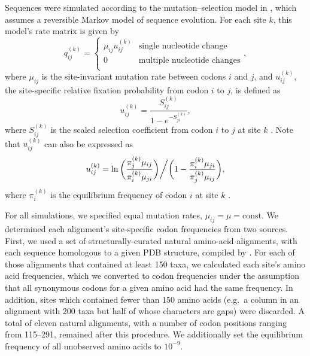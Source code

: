 \documentclass[11pt]{article}
\begin{document}
Sequences were simulated according to the mutation--selection model in \citet{HalpernBruno1998}, which assumes a reversible Markov model of sequence evolution. For each site $k$, this model's rate matrix is given by
\begin{equation}\label{eq:hb98}
   q_{ij}^{(k)} = \left\{
   \begin{array}{rl}
   	\mu_{ij} u_{ij}^{(k)} &\text{single nucleotide change} \\
   	0                  &\text{multiple nucleotide changes} \\
\end{array} \right., \end{equation}
where $\mu_{ij}$ is the site-invariant mutation rate between codons $i$ and $j$, and $u_{ij}^{(k)}$, the site-specific relative fixation probability from codon $i$ to $j$, is defined as
\begin{equation}u_{ij}^{(k)} = \frac{S_{ij}^{(k)}}{1 - e^{-S_{ji}^{(k)}}},\end{equation} where $S_{ij}^{(k)}$ is the scaled selection coefficient from codon $i$ to $j$ at site $k$ \citep{HalpernBruno1998}. Note that $u_{ij}^{(k)}$ can also be expressed as
\begin{equation}u_{ij}^{(k)} = \ln\bigg{(}\frac{\pi_j^{(k)}\mu_{ij}}{\pi_i^{(k)}\mu_{ji}}\bigg{)}\bigg{/}\bigg{(}1 - \frac{\pi_i^{(k)}\mu_{ji}}{\pi_j^{(k)}\mu_{ij}}\bigg{)},\end{equation}
where $\pi_i^{(k)}$ is the equilibrium frequency of codon $i$ at site $k$ \citep{HalpernBruno1998,SpielmanWilke2015}.

For all simulations, we specified equal mutation rates, $\mu_{ij}=\mu=\text{const.}$ We determined each alignment's site-specific codon frequencies from two sources. First, we used a set of structurally-curated natural amino-acid alignments, with each sequence homologous to a given PDB structure, compiled by \citet{Ramseyetal2011}. For each of those alignments that contained at least 150 taxa, we calculated each site's amino acid frequencies, which we converted to codon frequencies under the assumption that all synonymous codons for a given amino acid had the same frequency. In addition, sites which contained fewer than 150 amino acids (e.g.\ a column in an alignment with 200 taxa but half of whose characters are gaps) were discarded. A total of eleven natural alignments, with a number of codon positions ranging from 115--291, remained after this procedure. We additionally set the equilibrium frequency of all unobserved amino acids to $10^{-9}$.
\end{document}
